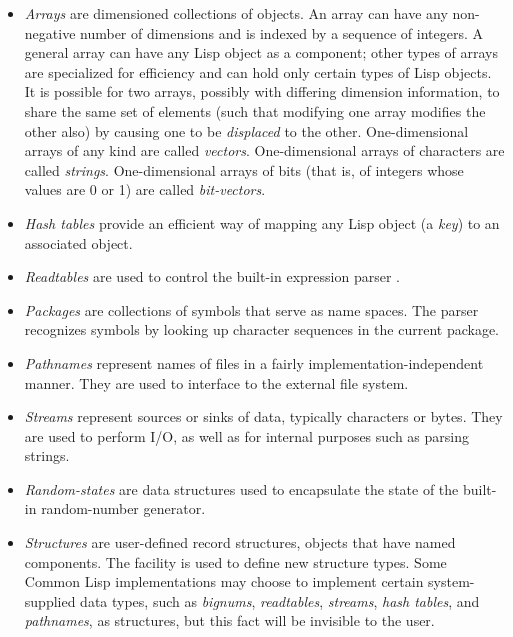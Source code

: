 \begin{itemize}
\item
\emph{Arrays} are dimensioned collections of objects.
An array can have any non-negative number of dimensions and is indexed
by a sequence of integers.  A general array can have any Lisp object as
a component; other types of arrays are specialized for efficiency
and can hold only certain types of Lisp objects.
It is possible for two arrays, possibly with differing dimension information,
to share the same set of elements (such that modifying one array modifies
the other also) by causing one to be \emph{displaced} to the other.
One-dimensional arrays of any kind are called \emph{vectors}.
One-dimensional arrays of characters are called \emph{strings}.
One-dimensional arrays of bits (that is, of integers whose values are 0 or 1)
are called \emph{bit-vectors}.

\item
\emph{Hash tables} provide an efficient way of mapping any
Lisp object (a \emph{key}) to an associated object.

\item
\emph{Readtables} are used to control the built-in expression parser
.

\item
\emph{Packages} are collections of symbols that serve as name spaces.
The parser recognizes symbols by looking up character sequences
in the current package.

\item
\emph{Pathnames} represent names of files in a fairly implementation-independent
manner.  They are used to interface to the external file system.

\item
\emph{Streams} represent sources or sinks of data, typically characters
or bytes.  They are used to perform I/O, as well as for internal
purposes such as parsing strings.

\item
\emph{Random-states} are data structures used to encapsulate the state
of the built-in random-number generator.

\item
\emph{Structures} are user-defined record structures, objects that
have named components.  The  facility is used
to define new structure types.  Some Common Lisp implementations may
choose to implement certain system-supplied data types,
such as \emph{bignums}, \emph{readtables}, \emph{streams},
\emph{hash tables}, and \emph{pathnames}, as structures,
but this fact will be invisible to the user.


\end{itemize}
